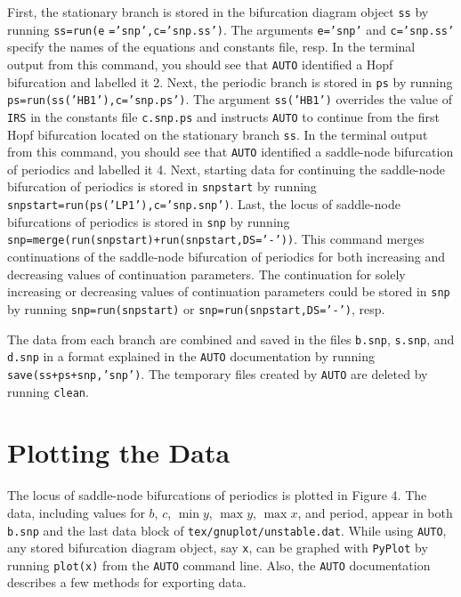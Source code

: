 \documentclass[a4paper,11pt]{article}
\begin{document}
\noindent
First, the stationary branch is stored in the bifurcation diagram object \texttt{ss} by running \texttt{ss=run(e} \texttt{='snp',c='snp.ss')}. The arguments \texttt{e='snp'} and \texttt{c='snp.ss'} specify the names of the equations and constants file, resp. In the terminal output from this command, you should see that \texttt{AUTO} identified a Hopf bifurcation and labelled it 2. Next, the periodic branch is stored in \texttt{ps} by running \texttt{ps=run(ss('HB1'),c='snp.ps')}. The argument \texttt{ss('HB1')} overrides the value of \texttt{IRS} in the constants file \texttt{c.snp.ps} and instructs \texttt{AUTO} to continue from the first Hopf bifurcation located on the stationary branch \texttt{ss}. In the terminal output from this command, you should see that \texttt{AUTO} identified a saddle-node bifurcation of periodics and labelled it 4. Next, starting data for continuing the saddle-node bifurcation of periodics is stored in \texttt{snpstart} by running \texttt{snpstart=run(ps('LP1'),c='snp.snp')}. Last, the locus of saddle-node bifurcations of periodics is stored in \texttt{snp} by running \texttt{snp=merge(run(snpstart)+run(snpstart,DS='-'))}. This command merges continuations of the saddle-node bifurcation of periodics for both increasing and decreasing values of continuation parameters. The continuation for solely increasing or decreasing values of continuation parameters could be stored in \texttt{snp} by running \texttt{snp=run(snpstart)} or \texttt{snp=run(snpstart,DS='-')}, resp.\vspace{3mm}

\noindent
The data from each branch are combined and saved in the files \texttt{b.snp}, \texttt{s.snp}, and \texttt{d.snp} in a format explained in the \texttt{AUTO} documentation by running \texttt{save(ss+ps+snp,'snp')}. The temporary files created by \texttt{AUTO} are deleted by running \texttt{clean}.

\section*{Plotting the Data}

\noindent
The locus of saddle-node bifurcations of periodics is plotted in Figure 4. The data, including values for $b$, $c$, $\min y$, $\max y$, $\max x$, and period, appear in both \texttt{b.snp} and the last data block of \texttt{tex/gnuplot/unstable.dat}. While using \texttt{AUTO}, any stored bifurcation diagram object, say \texttt{x}, can be graphed with \texttt{PyPlot} by running \texttt{plot(x)} from the \texttt{AUTO} command line. Also, the \texttt{AUTO} documentation describes a few methods for exporting data.\vspace{3mm}
\end{document}
